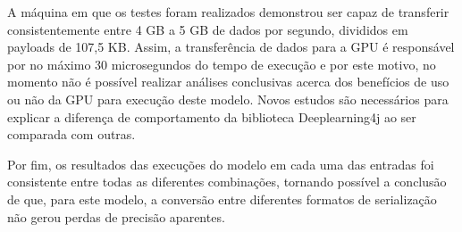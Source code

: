 A máquina em que os testes foram realizados demonstrou ser capaz de transferir consistentemente entre 4 GB a 5 GB de dados por segundo, divididos em payloads de 107,5 KB. Assim, a transferência de dados para a GPU é responsável por no máximo 30 microsegundos do tempo de execução e por este motivo, no momento não é possível realizar análises conclusivas acerca dos benefícios de uso ou não da GPU para execução deste modelo. Novos estudos são necessários para explicar a diferença de comportamento da biblioteca Deeplearning4j ao ser comparada com outras.

Por fim, os resultados das execuções do modelo em cada uma das entradas foi consistente entre todas as diferentes combinações, tornando possível a conclusão de que, para este modelo, a conversão entre diferentes formatos de serialização não gerou perdas de precisão aparentes.